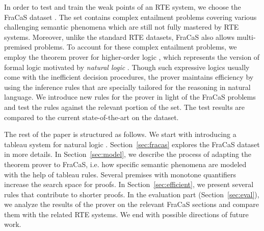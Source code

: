 \documentclass[11pt]{article}
\newcommand{\addlater}[1]{\todo[line,size=\tiny]{#1}}
\begin{document}

In order to test and train the weak points of an RTE system, we choose the FraCaS dataset \cite{fracas}.
The set contains complex entailment problems covering various challenging semantic phenomena which are still not fully mastered by RTE systems.
Moreover, unlike the standard RTE datasets, FraCaS also allows multi-premised problems. 
To account for these complex entailment problems, we employ the theorem prover for higher-order logic \cite{abzianidze:2015:EMNLP}, which represents the version of formal logic motivated by  {\em natural logic} \cite{lakoff:70,essays:86}. 
Though such expressive logics usually come with the inefficient decision procedures, the prover maintains efficiency by using the inference rules that are specially tailored for the reasoning in natural language.
We introduce new rules for the prover in light of the FraCaS problems and test the rules against the relevant portion of the set.
The test results are compared to the current state-of-the-art on the dataset.

The rest of the paper is structured as follows. 
We start with introducing a tableau system for natural logic \cite{muskens:10}.
Section~\ref{sec:fracas} explores the FraCaS dataset in more details.
In Section~\ref{sec:model}, we describe the process of adapting the theorem prover to FraCaS, i.e. how specific semantic phenomena are modeled with the help of tableau rules.
Several premises with monotone quantifiers increase the search space for proofs.
In Section~\ref{sec:efficient}, we present several rules that contribute to shorter proofs.  
In the evaluation part (Section~\ref{sec:eval}), we analyze the results of the prover on the relevant FraCaS sections and compare them with the related RTE systems. 
We end with possible directions of future work.
\end{document}
